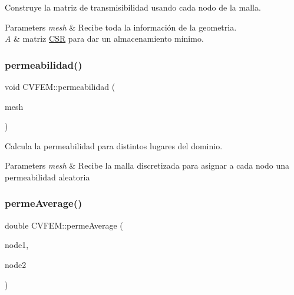 Construye la matriz de transmisibilidad usando cada nodo de la malla. 


\begin{DoxyParams}{Parameters}
{\em mesh} & Recibe toda la información de la geometria. \\
\hline
{\em A} & matriz \hyperlink{class_c_s_r}{C\+SR} para dar un almacenamiento minimo. \\
\hline
\end{DoxyParams}
\hypertarget{class_c_v_f_e_m_a7323da10f16f95f4650c4cf020696271}{}\label{class_c_v_f_e_m_a7323da10f16f95f4650c4cf020696271} 
\subsubsection{\texorpdfstring{permeabilidad()}{permeabilidad()}}
{\footnotesize\ttfamily void C\+V\+F\+E\+M\+::permeabilidad (\begin{DoxyParamCaption}\item[{\hyperlink{class_mesh}{Mesh} \&}]{mesh }\end{DoxyParamCaption})}



Calcula la permeabilidad para distintos lugares del dominio. 


\begin{DoxyParams}{Parameters}
{\em mesh} & Recibe la malla discretizada para asignar a cada nodo una permeabilidad aleatoria \\
\hline
\end{DoxyParams}
\hypertarget{class_c_v_f_e_m_a53be673ba0746356b4253b7e1f0699b4}{}\label{class_c_v_f_e_m_a53be673ba0746356b4253b7e1f0699b4} 
\subsubsection{\texorpdfstring{perme\+Average()}{permeAverage()}}
{\footnotesize\ttfamily double C\+V\+F\+E\+M\+::perme\+Average (\begin{DoxyParamCaption}\item[{double}]{node1,  }\item[{double}]{node2 }\end{DoxyParamCaption})\hspace{0.3cm}{\ttfamily [inline]}}



